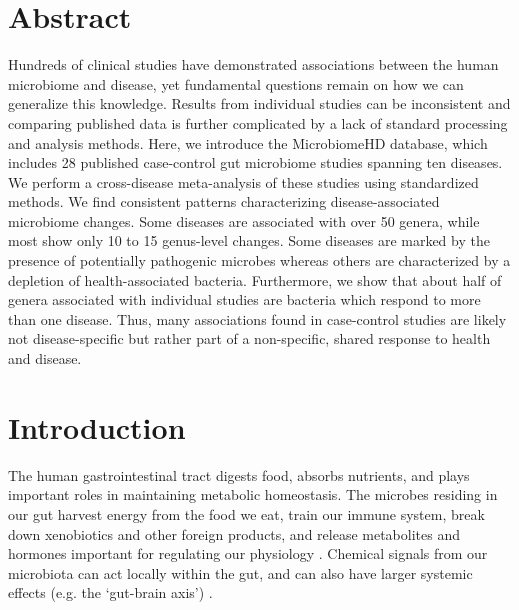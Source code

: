 


\section*{Abstract}
Hundreds of clinical studies have demonstrated associations between the human microbiome and disease, yet fundamental questions remain on how we can generalize this knowledge.
Results from individual studies can be inconsistent and comparing published data is further complicated by a lack of standard processing and analysis methods.
Here, we introduce the MicrobiomeHD database, which includes 28 published case-control gut microbiome studies spanning ten diseases.
We perform a cross-disease meta-analysis of these studies using standardized methods.
We find consistent patterns characterizing disease-associated microbiome changes.
Some diseases are associated with over 50 genera, while most show only 10 to 15 genus-level changes.
Some diseases are marked by the presence of potentially pathogenic microbes whereas others are characterized by a depletion of health-associated bacteria.
Furthermore, we show that about half of genera associated with individual studies are bacteria which respond to more than one disease.
Thus, many associations found in case-control studies are likely not disease-specific but rather part of a non-specific, shared response to health and disease.

\newpage

\section{Introduction}

The human gastrointestinal tract digests food, absorbs nutrients, and plays important roles in maintaining metabolic homeostasis.
The microbes residing in our gut harvest energy from the food we eat, train our immune system, break down xenobiotics and other foreign products, and release metabolites and hormones important for regulating our physiology \cite{nash-baker, asd-kb, turnbaugh2006obesity}.
Chemical signals from our microbiota can act locally within the gut, and can also have larger systemic effects (e.g. the `gut-brain axis') \cite{Hsiao2013gutbrain,Cryan2012gutbrain,Poutahidis2013gutbrain}.

